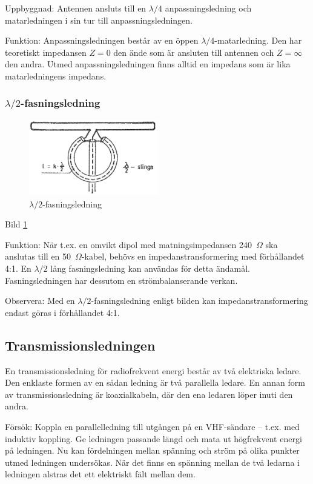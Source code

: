 Uppbyggnad: Antennen ansluts till en \(\lambda/4\) anpassningsledning
och matarledningen i sin tur till anpassningsledningen.

Funktion: Anpassningsledningen består av en öppen
\(\lambda/4\)-matarledning. Den har teoretiskt impedansen \(Z = 0\)
den ände som är ansluten till antennen och \(Z = \infty\) den
andra. Utmed anpassningsledningen finns alltid en impedans som är lika
matarledningens impedans.

\subsubsection{$\lambda/2$-fasningsledning}

\begin{figure}
  \includegraphics[width=0.5\textwidth]{images/cropped_pdfs/bild_2_6-32.pdf}
  \caption{$\lambda/2$-fasningsledning}
  \label{fig:bildII6-32}
\end{figure}

Bild \ref{fig:bildII6-32}

Funktion: När t.ex. en omvikt dipol med matningsimpedansen 240~\(\Omega\) ska
anslutas till en 50~\(\Omega\)-kabel, behövs en impedanstransformering med
förhållandet 4:1. En \(\lambda/2\) lång fasningsledning kan användas för detta
ändamål. Fasningsledningen har dessutom en strömbalanserande verkan.

Observera: Med en \(\lambda/2\)-fasningsledning enligt bilden kan
impedanstransformering endast göras i förhållandet 4:1.

\subsection{Transmissionsledningen}

En transmissionsledning för radiofrekvent energi består av två
elektriska ledare.  Den enklaste formen av en sådan ledning är
två parallella ledare. En annan form av transmissionsledning är
koaxialkabeln, där den ena ledaren löper inuti den andra.

Försök: Koppla en parallelledning till utgången på en VHF-sändare --
t.ex. med induktiv koppling. Ge ledningen passande längd och mata ut
högfrekvent energi på ledningen. Nu kan fördelningen mellan spänning
och ström på olika punkter utmed ledningen undersökas. När det finns
en spänning mellan de två ledarna i ledningen alstras det ett
elektriskt fält mellan dem.

